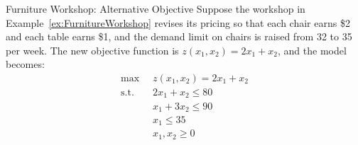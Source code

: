 \begin{example}{Furniture Workshop: Alternative Objective}\label{exa:FurnitureWorkshopAltOpt}
Suppose the workshop in Example~\ref{ex:FurnitureWorkshop} revises its pricing so that each chair earns \$2 and each table earns \$1, and the demand limit on chairs is raised from 32 to 35 per week. The new objective function is $z(x_1,x_2) = 2x_1 + x_2$, and the model becomes:
\begin{equation}
\begin{aligned}
\max\;\;& z(x_1,x_2) = 2x_1 + x_2\\
\text{s.t.}\;\;&  2x_1 + x_2 \leq 80\\
& x_1 + 3x_2 \leq 90\\
& x_1 \leq 35\\
& x_1, x_2 \geq 0
\end{aligned}
\label{eqn:FurnitureWorkshopAltOpt}
\end{equation}
\end{example}

